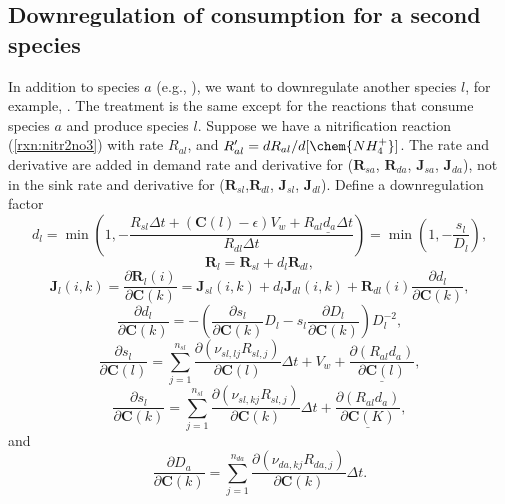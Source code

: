 \documentclass[gmd, manuscript]{copernicus}
\begin{document}
\subsection{Downregulation of consumption for a second species}
In addition to species $a$ (e.g., ), we want to downregulate
another species $l$, for example, . The treatment is the same
except for the reactions that consume species $a$ and produce species $l$.
Suppose we have a nitrification reaction (\ref{rxn:nitr2no3}) with rate
$R_{al}$, and $R_{al}' = dR_{al}/d[\chem{NH_4^+}]$. The rate and derivative are
added in demand rate and derivative for  ($\mathbf{R}_{sa}$,
$\mathbf{R}_{da}$, $\mathbf{J}_{sa}$, $\mathbf{J}_{da}$), not in the sink rate
and derivative for  ($\mathbf{R}_{sl}$,$\mathbf{R}_{dl}$,
$\mathbf{J}_{sl}$, $\mathbf{J}_{dl}$). Define a downregulation factor 
\begin{equation}
d_l=\min\left(1, -\frac{R_{sl} \Delta t + (\mathbf{C}(l)-\epsilon) V_w +
\underline{R_{al}d_a\Delta t}} {R_{dl} \Delta t}\right)=\min(1,
-\frac{s_l}{D_l}),
\end{equation}
\begin{equation}
\mathbf{R}_l=\mathbf{R}_{sl}+d_l \mathbf{R}_{dl},
\end{equation}
\begin{equation}
\mathbf{J}_l (i,k)=\frac{\partial \mathbf{R}_l(i)}{\partial \mathbf{C}(k)}
=\mathbf{J}_{sl} (i,k)+d_l \mathbf{J}_{dl} (i,k)+\mathbf{R}_{dl} (i)
\frac{\partial d_l}{\partial \mathbf{C}(k)}, 
\end{equation}
\begin{equation}
\frac{\partial d_l}{\partial \mathbf{C}(k)} =-\left(\frac{\partial
s_l}{\partial \mathbf{C}(k)} D_l - s_l \frac{\partial D_l}{\partial
\mathbf{C}(k)}\right)D_l^{-2}, 
\end{equation}
\begin{equation}
\frac{\partial s_l}{\partial \mathbf{C}(l)} =\sum_{j=1}^{n_{sl}}
\frac{\partial (\nu_{sl,lj}R_{sl,j})}{\partial \mathbf{C}(l)} \Delta t + V_w +
\underline{\frac{\partial (R_{al}d_a)}{\partial \mathbf{C}(l)}}, 
\end{equation}
\begin{equation}
\frac{\partial s_l}{\partial \mathbf{C}(k)} =\sum_{j=1}^{n_{sl}} \frac{\partial
(\nu_{sl,kj}R_{sl,j})}{\partial \mathbf{C}(k)} \Delta t +
\underline{\frac{\partial (R_{al}d_a)}{\partial \mathbf{C}(K)}}, 
\end{equation}
and
\begin{equation}
\frac{\partial D_a}{\partial \mathbf{C}(k)} =\sum_{j=1}^{n_{da}}
\frac{\partial (\nu_{da,kj}R_{da,j})}{\partial \mathbf{C}(k)} \Delta t. 
\end{equation}
\end{document}
